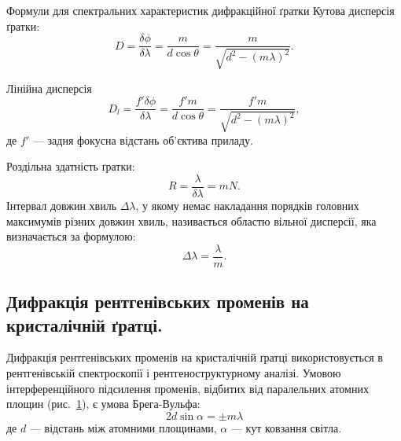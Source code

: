 \begin{Theory}{Формули для спектральних характеристик дифракційної ґратки}
    Кутова дисперсія ґратки:
    \begin{equation}\label{eq:Difraction_angular_dispersion}
        D = \frac{\delta\phi}{\delta\lambda} = \frac{m}{d\cos\theta} = \frac{m}{\sqrt{d^2 - (m\lambda)^2}}.
    \end{equation}

    Лінійна дисперсія
    \begin{equation}\label{eq:Difraction_linear_dispersion}
        D_l = \frac{f'\delta\phi}{\delta\lambda} = \frac{f'm}{d\cos\theta} = \frac{f'm}{\sqrt{d^2 - (m\lambda)^2}},
    \end{equation}
    де $f'$ --- задня фокусна відстань об'єктива приладу.

    Роздільна здатність ґратки:
    \begin{equation}\label{eq:Difraction_Slots_resolution}
        R = \frac{\lambda}{\delta\lambda} = mN.
    \end{equation}
    Інтервал довжин хвиль $\Delta\lambda$, у якому немає накладання порядків головних максимумів різних довжин хвиль, називається областю вільної дисперсії, яка визначається за формулою:
    \begin{equation}\label{eq:Difraction_free_dispersion}
        \Delta\lambda = \frac{\lambda}{m}.
    \end{equation}
\end{Theory}




\subsection*{Дифракція рентгенівських променів на кристалічній ґратці.}


Дифракція рентгенівських променів на кристалічній ґратці
використовується в рентгенівській спектроскопії і рентгеноструктурному
аналізі. Умовою інтерференційного підсилення променів, відбитих від
паралельних атомних площин (рис.~\ref{pic:X-ray_difraction}), є умова Брега-Вульфа:
\begin{equation}\label{eq:Brag-Wolf}
    2d\sin\alpha = \pm m\lambda
\end{equation}
де $d$ --- відстань між атомними площинами, $\alpha$ --- кут ковзання світла.


\begin{figure}[h!]\centering
    
    \caption{}
    \label{pic:X-ray_difraction}
\end{figure}


